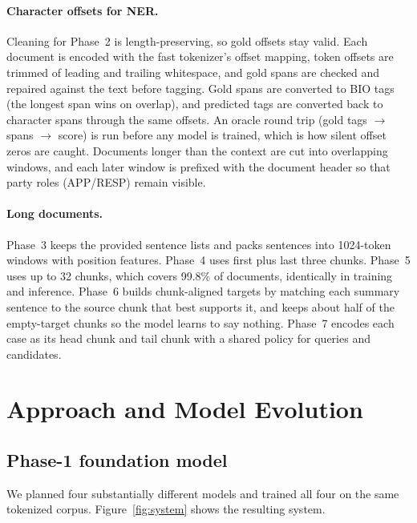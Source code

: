 \documentclass[11pt, oneside]{article}
\begin{document}
\paragraph{Character offsets for NER.} Cleaning for Phase~2 is length-preserving, so gold offsets stay valid. Each document is encoded with the fast tokenizer's offset mapping, token offsets are trimmed of leading and trailing whitespace, and gold spans are checked and repaired against the text before tagging. Gold spans are converted to BIO tags (the longest span wins on overlap), and predicted tags are converted back to character spans through the same offsets. An oracle round trip (gold tags $\rightarrow$ spans $\rightarrow$ score) is run before any model is trained, which is how silent offset zeros are caught. Documents longer than the context are cut into overlapping windows, and each later window is prefixed with the document header so that party roles (APP/RESP) remain visible.

\paragraph{Long documents.} Phase~3 keeps the provided sentence lists and packs sentences into 1024-token windows with position features. Phase~4 uses first plus last three chunks. Phase~5 uses up to 32 chunks, which covers 99.8\% of documents, identically in training and inference. Phase~6 builds chunk-aligned targets by matching each summary sentence to the source chunk that best supports it, and keeps about half of the empty-target chunks so the model learns to say nothing. Phase~7 encodes each case as its head chunk and tail chunk with a shared policy for queries and candidates.

\section{Approach and Model Evolution}\label{sec:approach}
\subsection{Phase-1 foundation model}
We planned four substantially different models and trained all four on the same tokenized corpus. Figure~\ref{fig:system} shows the resulting system.
\end{document}
